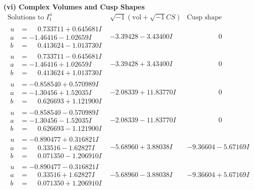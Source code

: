 \documentclass[1p]{elsarticle_modified}
\theoremstyle{definition}
\newcommand{\I}{\sqrt{-1}}
\begin{document}
\newpage\flushleft \textbf{(vi) Complex Volumes and Cusp Shapes}
$$\begin{array}{c|c|c}  
\text{Solutions to }I^u_{1}& \I (\text{vol} + \sqrt{-1}CS) & \text{Cusp shape}\\
 \hline 
\begin{aligned}
u &= \phantom{-}0.733711 + 0.645681 I \\
a &= -1.46416 - 1.02659 I \\
b &= \phantom{-}0.413624 - 1.013730 I\end{aligned}
 & -3.39428 - 3.43400 I & \phantom{-0.000000 } 0 \\ \hline\begin{aligned}
u &= \phantom{-}0.733711 - 0.645681 I \\
a &= -1.46416 + 1.02659 I \\
b &= \phantom{-}0.413624 + 1.013730 I\end{aligned}
 & -3.39428 + 3.43400 I & \phantom{-0.000000 } 0 \\ \hline\begin{aligned}
u &= -0.858540 + 0.570989 I \\
a &= -1.30456 + 1.52035 I \\
b &= \phantom{-}0.626693 + 1.121900 I\end{aligned}
 & -2.08339 + 11.83770 I & \phantom{-0.000000 } 0 \\ \hline\begin{aligned}
u &= -0.858540 - 0.570989 I \\
a &= -1.30456 - 1.52035 I \\
b &= \phantom{-}0.626693 - 1.121900 I\end{aligned}
 & -2.08339 - 11.83770 I & \phantom{-0.000000 } 0 \\ \hline\begin{aligned}
u &= -0.890477 + 0.316821 I \\
a &= \phantom{-}0.33516 - 1.62827 I \\
b &= \phantom{-}0.071350 - 1.206910 I\end{aligned}
 & -5.68960 + 3.88038 I & -9.36604 - 5.67169 I \\ \hline\begin{aligned}
u &= -0.890477 - 0.316821 I \\
a &= \phantom{-}0.33516 + 1.62827 I \\
b &= \phantom{-}0.071350 + 1.206910 I\end{aligned}
 & -5.68960 - 3.88038 I & -9.36604 + 5.67169 I \\ \hline\begin{aligned}

\end{aligned}
\end{array}$$
\end{document}

